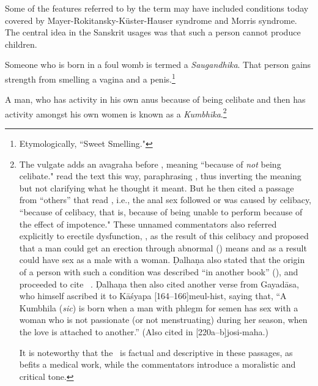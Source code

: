 \begin{translation}
{\label{ṣaṇḍha}
Some of the features referred to by the term  may
have included conditions today covered by
Mayer-Rokitansky-Küster-Hauser syndrome and Morris syndrome.  The
central idea in the Sanskrit usages was that such a person cannot
produce children.}

\item[39]

Someone who is born in a foul womb is termed a \emph{Saugandhika}. 
That person gains strength from smelling a vagina and a
penis.\footnote{Etymologically, “Sweet Smelling."}

\item[40abc]

A man, who has activity in his own anus because of being celibate and
then has activity amongst his own women is known as a
\emph{Kumbhīka}.\footnote{The vulgate adds an avagraha before
    , meaning “because of \emph{not} being celibate."
     read the text this way, paraphrasing
    , thus inverting the meaning but not clarifying
    what he thought it meant.  But he then cited a passage from “others”
    that read , i.e., the anal sex followed or was
    caused by celibacy,  “because of celibacy, that is,
    because of being unable to perform because of the effect of
    impotence."  These unnamed commentators also referred explicitly to
    erectile dysfunction, , as the result of
    this celibacy and proposed that a man could get an erection through
    abnormal () means and as a result could have sex as a
    male with a woman.  Ḍalhaṇa also stated that the origin of a person
    with such a condition was described “in another book”
    (), and proceeded to cite \CS\ .  
    Ḍalhaṇa then also cited another verse from Gayadāsa, who himself 
    ascribed it to Kāśyapa [164--166]{meul-hist}, saying that, “A 
    Kumbhila (\emph{sic}) is born when a man with phlegm for semen 
    has sex with a woman who is not passionate (or not menstruating) during 
    her season, when the love is attached to another.” (Also cited in 
    [220a--b]{josi-maha}.)
    
    It is noteworthy that the \SS\ is factual and descriptive in
these passages, as befits a medical work, while the commentators
introduce a moralistic and critical tone.}

\item[40d--41abc]


\end{translation}
